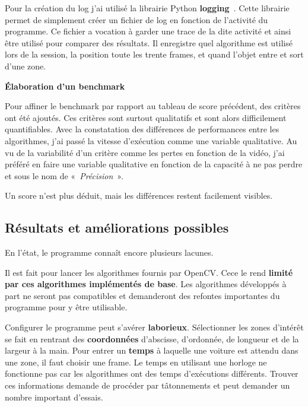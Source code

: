  Pour la création du log j'ai utilisé la librairie Python \textbf{logging}~\cite{log}. Cette librairie permet de simplement créer un fichier de log en fonction de l'activité du programme. Ce fichier a vocation à garder une trace de la dite activité et ainsi être utilisé pour comparer des résultats. Il enregistre quel algorithme est utilisé lors de la session, la position toute les trente frames, et quand l'objet entre et sort d'une zone.

\textbf{Élaboration d'un benchmark}

  Pour affiner le benchmark par rapport au tableau de score précédent, des critères ont été ajoutés. Ces critères sont surtout qualitatifs et sont alors difficilement quantifiables. Avec la constatation des différences de performances entre les algorithmes, j'ai passé la vitesse d’exécution comme une variable qualitative. Au vu de la variabilité d'un critère comme les pertes en fonction de la vidéo, j'ai préféré en faire une variable qualitative en fonction de la capacité à ne pas perdre et sous le nom de «~\textit{Précision}~». 


Un score n'est plus déduit, mais les différences restent facilement visibles.


  \subsection{Résultats et améliorations possibles}
    En l'état, le programme connaît encore plusieurs lacunes. 
    
    Il est fait pour lancer les algorithmes fournis par OpenCV. Cece le rend \textbf{limité par ces algorithmes implémentés de base}. Les algorithmes développés à part ne seront pas compatibles et demanderont des refontes importantes du programme pour y être utilisable. 
    
    Configurer le programme peut s'avérer \textbf{laborieux}. Sélectionner les zones d’intérêt se fait en rentrant des \textbf{coordonnées} d’abscisse, d'ordonnée, de longueur et de la largeur à la main.
Pour entrer un \textbf{temps} à laquelle une voiture est attendu dans une zone, il faut choisir une frame. Le temps en utilisant une horloge ne fonctionne pas car les algorithmes ont des temps d'exécutions différents. Trouver ces informations demande de procéder par tâtonnements et peut demander un nombre important d'essais.
    
